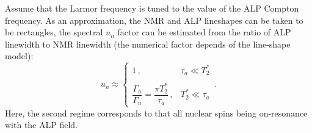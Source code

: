 Assume that the Larmor frequency is tuned to the value of the ALP Compton frequency. As an approximation, the NMR and ALP lineshapes can be taken to be rectangles, the spectral $u_n$ factor can be estimated from the ratio of ALP linewidth to NMR linewidth (the numerical factor depends of the line-shape model):
\begin{equation}
    u_n \approx \left\{
    \begin{array}{cl}
    1\,,
    &  \tau_a \ll T_2^* \\
    & \\
    \dfrac{\Gamma_a }{ \Gamma_{n} } = \dfrac{\pi T_2^*}{\tau_a}\,,
    &  T_2^* \ll \tau_a
    \end{array} \right.
    \,.\label{eq:un}
\end{equation}
Here, the second regime corresponds to that all nuclear spins being on-resonance with the ALP field. 


